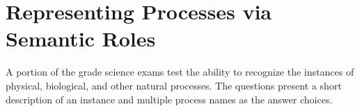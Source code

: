 \section{Representing Processes via Semantic Roles}

A portion of the grade science exams test the ability to recognize the instances of physical, biological, and other natural processes. 
The questions present a short description of an instance and multiple process names as the answer choices. 








